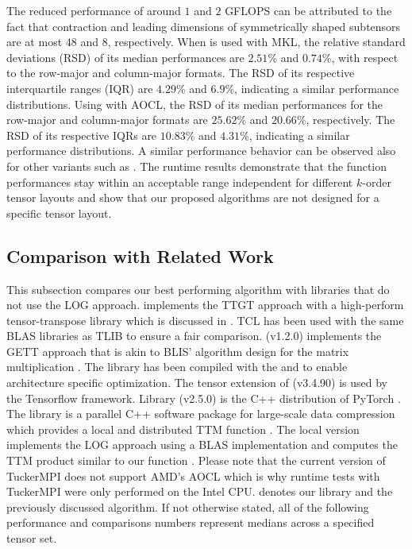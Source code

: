 The reduced performance of around $1$ and $2$ GFLOPS can be attributed to the fact that contraction and leading dimensions of symmetrically shaped subtensors are at most $48$ and $8$, respectively.
When  is used with MKL, the relative standard deviations (RSD) of its median performances are $2.51$\% and $0.74$\%, with respect to the row-major and column-major formats.
The RSD of its respective interquartile ranges (IQR) are $4.29$\% and $6.9$\%, indicating a similar performance distributions.
Using  with AOCL, the RSD of its median performances for the row-major and column-major formats are $25.62$\% and $20.66$\%, respectively.
The RSD of its respective IQRs are $10.83$\% and $4.31$\%, indicating a similar performance distributions.
A similar performance behavior can be observed also for other  variants such as .
The runtime results demonstrate that the function performances stay within an acceptable range independent for different $k$-order tensor layouts and show that our proposed algorithms are not designed for a specific tensor layout.






\subsection{Comparison with Related Work}
This subsection compares our best performing algorithm with libraries that do not use the LOG approach.
 implements the TTGT approach with a high-perform tensor-transpose library  which is discussed in \cite{springer:2018:design}.
TCL has been used with the same BLAS libraries as TLIB to ensure a fair comparison.
 (v1.2.0) implements the GETT approach that is akin to BLIS' algorithm design for the matrix multiplication \cite{matthews:2018:high}.
The library has been compiled with the  and  to enable architecture specific optimization.
The tensor extension of  (v3.4.90) is used by the Tensorflow framework.
Library  (v2.5.0) is the C++ distribution of PyTorch \cite{paszke:2019:pytorch}.
The  library is a parallel C++ software package for large-scale data compression which provides a local and distributed TTM function \cite{ballard:2020:tuckermpi}.
The local version implements the LOG approach using a BLAS implementation and computes the TTM product similar to our function .
Please note that the current version of TuckerMPI does not support AMD's AOCL which is why runtime tests with TuckerMPI were only performed on the Intel CPU.
 denotes our library and the previously discussed  algorithm.
If not otherwise stated, all of the following performance and comparisons numbers represent medians across a specified tensor set.

